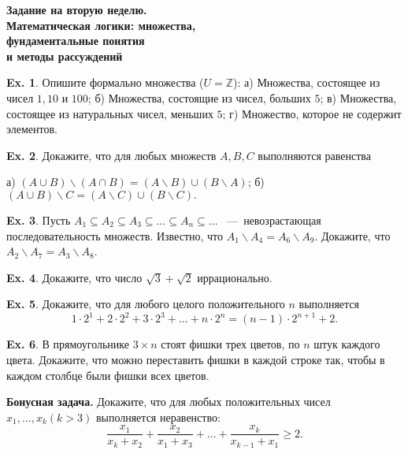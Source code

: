 \documentclass[12pt,a5paper,fleqn]{article}
\theoremstyle{definition}
\newtheorem{Ex}{Ex.}
\begin{document}
\newpage
\setcounter{Ex}{0}

\begin{center}
	{\bf \Large Задание на вторую неделю. \\ \normalsize Математическая логики: множества, \\ фундаментальные понятия
	\\и методы рассуждений}
\end{center}
\vspace{0.4cm}

\begin{Ex}
	Опишите формально множества ($U=\mathbb{Z}$): а) Множества, состоящее из чисел $1, 10$ и $100$;
	б) Множества, состоящие из чисел, больших $5$; в) Множества, состоящее из натуральных чисел,
	меньших $5$; г) Множество, которое не содержит элементов.
\end{Ex}

\begin{Ex}
	Докажите, что для любых множеств $A, B, C$ выполняются равенства 
	
	а) $(A\cup B)\backslash(A\cap B) = (A\backslash B)\cup(B\backslash A)$; 
	б) $(A\cup B)\backslash C = (A\backslash C)\cup(B\backslash C).$
\end{Ex}

\begin{Ex}
	Пусть $A_1\subseteq A_2\subseteq A_3\subseteq\ldots\subseteq A_n\subseteq\ldots $
	~---~невозрастающая последовательность множеств. Известно, что $A_1\backslash A_4
	= A_6\backslash A_9$. Докажите, что $A_2\backslash A_7 = A_3 \backslash A_8$.
\end{Ex}

\begin{Ex}
	Докажите, что число $\sqrt{3} + \sqrt{2}$ иррационально.
\end{Ex}

\begin{Ex}
	Докажите, что для любого целого положительного $n$ выполняется
	$$1\cdot 2^1 + 2 \cdot 2^2 + 3 \cdot 2^3 + \ldots + n \cdot 2^n = (n-1)\cdot 2^{n+1}+2.$$
\end{Ex}

\begin{Ex}
	В прямоугольнике $3\times n$ стоят фишки трех цветов, по $n$ штук каждого цвета.
	Докажите, что можно переставить фишки в каждой строке так, чтобы в каждом столбце 
	были фишки всех цветов.
\end{Ex}


\textbf{Бонусная задача.} Докажите, что для любых положительных чисел
$x_1,\ldots,x_k(k>3)$ выполняется неравенство:
$$\frac{x_1}{x_k + x_2} + \frac{x_2}{x_1 + x_3} + \ldots + 
\frac{x_k}{x_{k-1} + x_1}\geqslant 2.$$
\end{document}
